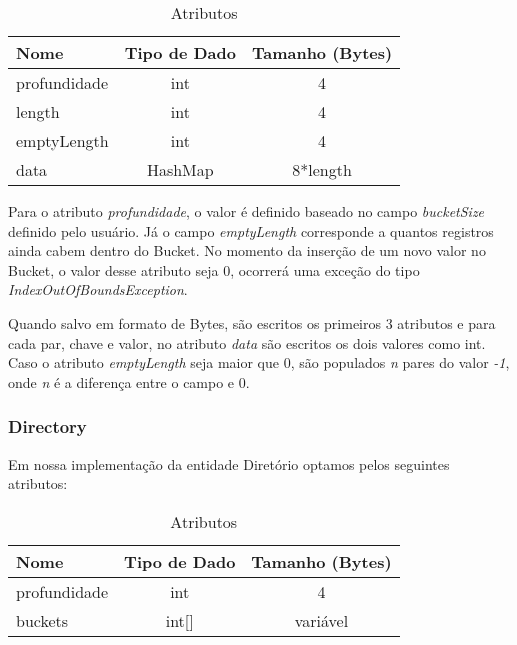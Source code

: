 \begin{table}[htb]
	\centering
	\caption{\hspace{0.1cm} Atributos }
	\vspace{-0.3cm} %
	\label{tab:tabela1}
	\begin{tabular}{l|c|c}
  \hline
    \textbf{Nome}	& \textbf{Tipo de Dado} & \textbf{Tamanho (Bytes)} \\
    \hline
     profundidade         & int           & 4 \\
     length   	    & int        & 4 \\
     emptyLength	& int & 4 \\
     data           & HashMap          & 8*length \\
     \hline
 \end{tabular}
\end{table}

Para o atributo \textit{profundidade}, o valor é definido baseado no campo \textit{bucketSize} definido pelo usuário. Já o campo \textit{emptyLength} corresponde a quantos registros ainda cabem dentro do Bucket. No momento da inserção de um novo valor no Bucket, o valor desse atributo seja 0, ocorrerá uma exceção do tipo \textit{IndexOutOfBoundsException}.

Quando salvo em formato de Bytes, são escritos os primeiros 3 atributos e para cada par, chave e valor, no atributo \textit{data} são escritos os dois valores como int. Caso o atributo \textit{emptyLength} seja maior que 0, são populados \textit{n} pares do valor \textit{-1}, onde \textit{n} é a diferença entre o campo e 0.

\subsubsection{\esp Directory}

Em nossa implementação da entidade Diretório optamos pelos seguintes atributos: 

\begin{table}[htb]
	\centering
	\caption{\hspace{0.1cm} Atributos }
	\vspace{-0.3cm} %
	\label{tab:tabela1}
	\begin{tabular}{l|c|c}
  \hline
    \textbf{Nome}	& \textbf{Tipo de Dado} & \textbf{Tamanho (Bytes)} \\
    \hline
     profundidade         & int           & 4 \\
     buckets   	    & int[]        & variável \\
     \hline
 \end{tabular}
\end{table}

